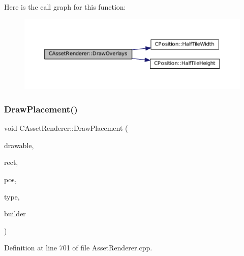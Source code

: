 Here is the call graph for this function\+:
\nopagebreak
\begin{figure}[H]
\begin{center}
\leavevmode
\includegraphics[width=350pt]{classCAssetRenderer_a1d2941f9b7aa116f578642c62410bb4a_cgraph}
\end{center}
\end{figure}
\hypertarget{classCAssetRenderer_af9cdf65db6c87c8cfd94fc4a84066b3e}{}\label{classCAssetRenderer_af9cdf65db6c87c8cfd94fc4a84066b3e} 
\subsubsection{\texorpdfstring{Draw\+Placement()}{DrawPlacement()}}
{\footnotesize\ttfamily void C\+Asset\+Renderer\+::\+Draw\+Placement (\begin{DoxyParamCaption}\item[{Gdk\+Drawable $\ast$}]{drawable,  }\item[{const \hyperlink{structSRectangle}{S\+Rectangle} \&}]{rect,  }\item[{const \hyperlink{classCPosition}{C\+Position} \&}]{pos,  }\item[{\hyperlink{GameDataTypes_8h_a5600d4fc433b83300308921974477fec}{E\+Asset\+Type}}]{type,  }\item[{std\+::shared\+\_\+ptr$<$ \hyperlink{classCPlayerAsset}{C\+Player\+Asset} $>$}]{builder }\end{DoxyParamCaption})}



Definition at line 701 of file Asset\+Renderer.\+cpp.


